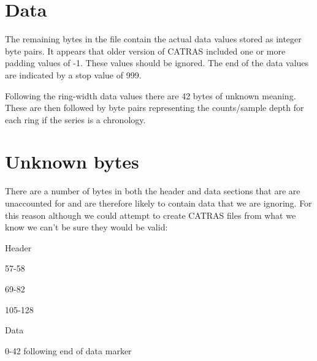 \section{Data}

The remaining bytes in the file contain the actual data values stored as integer byte pairs. It appears that older version of CATRAS included one or more padding values of -1. These values should be ignored. The end of the data values are indicated by a stop value of 999.

Following the ring-width data values there are 42 bytes of unknown meaning. These are then followed by byte pairs representing the counts/sample depth for each ring if the series is a chronology. 

\section{Unknown bytes}
There are a number of bytes in both the header and data sections that are are unaccounted for and are therefore likely to contain data that we are ignoring. For this reason although we could attempt to create CATRAS files from what we know we can't be sure they would be valid: 

\begin{itemize*}
 \item Header
   \begin{itemize*}
   \item 57-58
   \item 69-82
   \item 105-128
   \end{itemize*}
  \item Data
   \begin{itemize*}
    \item 0-42 following end of data marker    
   \end{itemize*}
\end{itemize*}

